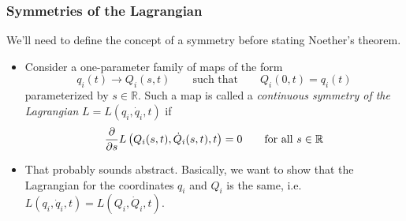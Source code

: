 \documentclass[11pt, a4paper]{article}
\newcommand{\eqtext}[1]{\qquad \text{#1} \qquad}
\newcommand{\R}{\mathbb{R}} %
\begin{document}
\subsubsection{Symmetries of the Lagrangian} \label{subsubsec:symmetries}
We'll need to define the concept of a symmetry before stating Noether's theorem.
\begin{itemize}
	\item Consider a one-parameter family of maps of the form
	\begin{equation*}
		q_i(t) \to Q_i(s, t) \eqtext{such that} Q_i(0, t) = q_i(t)
	\end{equation*}
	parameterized by $ s \in \R $.	Such a map is called a \textit{continuous symmetry of the Lagrangian} $ L = L(q_i, \dot{q}_i, t) $ if 
	\begin{equation*}
		\pdv{}{s} L\left (Q_i(s, t), \dot{Q}_i(s, t), t\right ) = 0 \qquad \text{for all } s \in \R
	\end{equation*}
	
	\item That probably sounds abstract. Basically, we want to show that the Lagrangian for the coordinates $ q_{i} $ and $ Q_{i} $ is the same, i.e. $ L(q_i, \dot{q}_i, t) = L(Q_i, \dot{Q}_i, t) $. 
	

\end{itemize}
\end{document}
